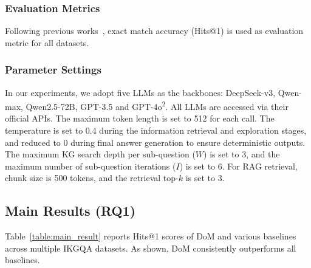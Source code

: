 \subsubsection{Evaluation Metrics} Following previous works~\cite{li2024chain, luo2024reasoning, luo2024chatkbqa, xu2024generate}, exact match accuracy (Hits@1) is used as evaluation metric for all datasets.

\subsubsection{Parameter Settings} In our experiments, we adopt five LLMs as the backbones: DeepSeek-v3, Qwen-max, Qwen2.5-72B, GPT-3.5 and GPT-4o\textsuperscript{2}. 
All LLMs are accessed via their official APIs. The maximum token length is set to 512 for each call. The temperature is set to 0.4 during the information retrieval and exploration stages, and reduced to 0 during final answer generation to ensure deterministic outputs. The maximum KG search depth per sub-question ($W$) is set to 3, and the maximum number of sub-question iterations ($I$) is set to 6. For RAG retrieval, chunk size is 500 tokens, and the retrieval top-$k$ is set to 3.


% 

\subsection{Main Results (RQ1)}
Table~\ref{table:main_result} reports Hits@1 scores of DoM and various baselines across multiple IKGQA datasets. As shown, DoM consistently outperforms all baselines.

